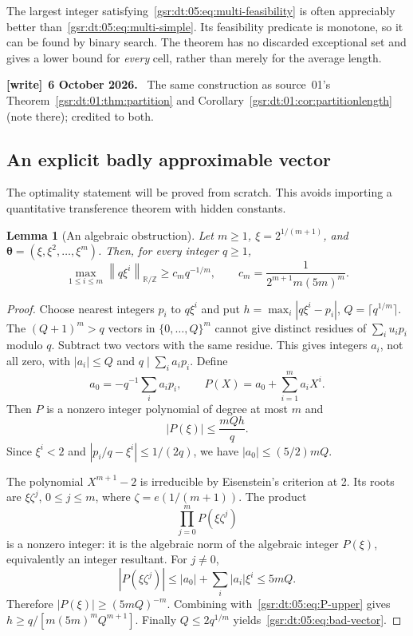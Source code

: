 \documentclass[11pt,letterpaper]{article}
\numberwithin{equation}{section}
\newtheorem{lemma}[theorem]{Lemma}
\theoremstyle{definition}
\theoremstyle{remark}
\newcommand{\R}{\mathbb R}
\newcommand{\Z}{\mathbb Z}
\newcommand{\1}{\mathbf 1}
\newcommand{\cnorm}[1]{\left\|#1\right\|_{\R/\Z}}
\newenvironment{writenote}[1][]{\par\smallskip\begingroup\small
 \noindent\textbf{[write]}\if\relax\detokenize{#1}\relax\else~\textbf{#1.}\fi\ }%
 {\par\endgroup\smallskip}
\begin{document}
The largest integer satisfying~\eqref{gsr:dt:05:eq:multi-feasibility} is often appreciably better than~\eqref{gsr:dt:05:eq:multi-simple}. Its feasibility predicate is monotone, so it can be found by binary search. The theorem has no discarded exceptional set and gives a lower bound for \emph{every} cell, rather than merely for the average length.
\begin{writenote}[6 October 2026]
The same construction as source~01's Theorem~\ref{gsr:dt:01:thm:partition} and Corollary~\ref{gsr:dt:01:cor:partitionlength} (note there); credited to both.
\end{writenote}

\subsection{An explicit badly approximable vector}
The optimality statement will be proved from scratch. This avoids importing a quantitative transference theorem with hidden constants.

\begin{lemma}[An algebraic obstruction]
\label{gsr:dt:05:lem:algebraic}
Let $m\geq1$, $\xi=2^{1/(m+1)}$, and
$\boldsymbol\theta=(\xi,\xi^2,\ldots,\xi^m)$. Then, for every integer $q\geq1$,
\begin{equation}
 \max_{1\leq i\leq m}\cnorm{q\xi^i}\geq c_mq^{-1/m},
 \qquad c_m=\frac1{2^{m+1}m(5m)^m}.
 \label{gsr:dt:05:eq:bad-vector}
\end{equation}
\end{lemma}
\begin{proof}
Choose nearest integers $p_i$ to $q\xi^i$ and put
$h=\max_i|q\xi^i-p_i|$, $Q=\lceil q^{1/m}\rceil$. The $(Q+1)^m>q$ vectors in $\{0,\ldots,Q\}^m$ cannot give distinct residues of $\sum_i u_ip_i$ modulo $q$. Subtract two vectors with the same residue. This gives integers $a_i$, not all zero, with $|a_i|\leq Q$ and $q\mid\sum_i a_ip_i$. Define
\[
 a_0=-q^{-1}\sum_i a_ip_i,\qquad P(X)=a_0+\sum_{i=1}^m a_iX^i.
\]
Then $P$ is a nonzero integer polynomial of degree at most $m$ and
\begin{equation}
 |P(\xi)|\leq\frac{mQh}{q}.
 \label{gsr:dt:05:eq:P-upper}
\end{equation}
Since $\xi^i<2$ and $|p_i/q-\xi^i|\leq1/(2q)$, we have $|a_0|\leq(5/2)mQ$.

The polynomial $X^{m+1}-2$ is irreducible by Eisenstein's criterion at 2. Its roots are $\xi\zeta^j$, $0\leq j\leq m$, where $\zeta=e(1/(m+1))$. The product
\[
 \prod_{j=0}^mP(\xi\zeta^j)
\]
is a nonzero integer: it is the algebraic norm of the algebraic integer $P(\xi)$, equivalently an integer resultant. For $j\ne0$,
\[
 |P(\xi\zeta^j)|\leq |a_0|+\sum_i|a_i|\xi^i\leq5mQ.
\]
Therefore $|P(\xi)|\geq(5mQ)^{-m}$. Combining with~\eqref{gsr:dt:05:eq:P-upper} gives
$h\geq q/[m(5m)^mQ^{m+1}]$. Finally $Q\leq2q^{1/m}$ yields~\eqref{gsr:dt:05:eq:bad-vector}.
\end{proof}
\end{document}
